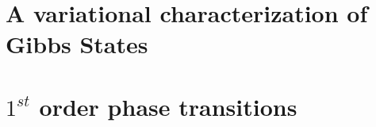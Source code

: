 

\section{A variational characterization of Gibbs States} 


\section{$1^{st}$ order phase transitions}
